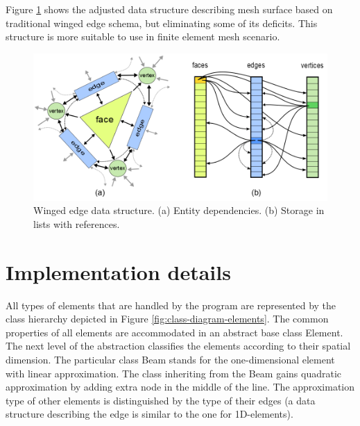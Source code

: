 Figure \ref{fig:winged-edge} shows the adjusted data structure describing mesh surface based on traditional winged edge schema, but eliminating some of its deficits. This structure is more suitable to use in finite element mesh scenario.

\begin{figure}[H]
\centering
\includegraphics[width=\textwidth]{figures/chapter-mesh-visualization/figure1}
\decoRule
\caption[Winged edge data structure.]{Winged edge data structure. (a) Entity dependencies. (b) Storage in lists with references.}
\label{fig:winged-edge}
\end{figure}



\section{Implementation details}
\label{sec:A-implementation}

All types of elements that are handled by the program are represented by the class hierarchy depicted in Figure \ref{fig:class-diagram-elements}. The common properties of all elements are accommodated in an abstract base class Element. The next level of the abstraction classifies the elements according to their spatial dimension. The particular class Beam stands for the one-dimensional element with linear approximation. The class inheriting from the Beam gains quadratic approximation by adding extra node in the middle of the line. The approximation type of other elements is distinguished by the type of their edges (a data structure describing the edge is similar to the one for 1D-elements).


